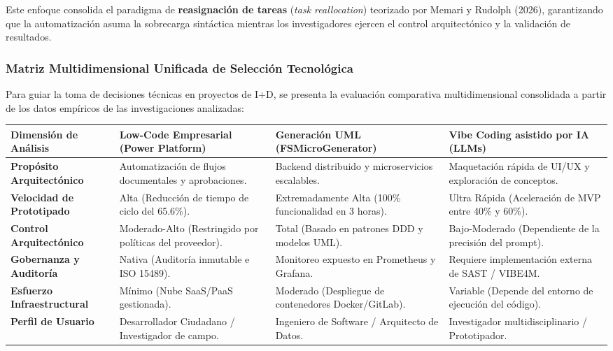 Este enfoque consolida el paradigma de \textbf{reasignación de tareas} (\textit{task reallocation}) teorizado por Memari y Rudolph (2026), garantizando que la automatización asuma la sobrecarga sintáctica mientras los investigadores ejercen el control arquitectónico y la validación de resultados.

\subsubsection{Matriz Multidimensional Unificada de Selección Tecnológica}

Para guiar la toma de decisiones técnicas en proyectos de I+D, se presenta la evaluación comparativa multidimensional consolidada a partir de los datos empíricos de las investigaciones analizadas:

\vspace{0.5cm}
\begin{center}
    \footnotesize
    \renewcommand{\arraystretch}{1.5}
    \begin{tabularx}{\textwidth}{>{\raggedright\arraybackslash\bfseries}p{2.8cm} >{\raggedright\arraybackslash}X >{\raggedright\arraybackslash}X >{\raggedright\arraybackslash}X}
    \toprule
    Dimensión de Análisis & \textbf{Low-Code Empresarial (Power Platform)} & \textbf{Generación UML (FSMicroGenerator)} & \textbf{Vibe Coding asistido por IA (LLMs)} \\
    \midrule
    Propósito Arquitectónico & Automatización de flujos documentales y aprobaciones. & Backend distribuido y microservicios escalables. & Maquetación rápida de UI/UX y exploración de conceptos. \\
    Velocidad de Prototipado & Alta (Reducción de tiempo de ciclo del 65.6\%). & Extremadamente Alta (100\% funcionalidad en 3 horas). & Ultra Rápida (Aceleración de MVP entre 40\% y 60\%). \\
    Control Arquitectónico & Moderado-Alto (Restringido por políticas del proveedor). & Total (Basado en patrones DDD y modelos UML). & Bajo-Moderado (Dependiente de la precisión del prompt). \\
    Gobernanza y Auditoría & Nativa (Auditoría inmutable e ISO 15489). & Monitoreo expuesto en Prometheus y Grafana. & Requiere implementación externa de SAST / VIBE4M. \\
    Esfuerzo Infraestructural & Mínimo (Nube SaaS/PaaS gestionada). & Moderado (Despliegue de contenedores Docker/GitLab). & Variable (Depende del entorno de ejecución del código). \\
    Perfil de Usuario & Desarrollador Ciudadano / Investigador de campo. & Ingeniero de Software / Arquitecto de Datos. & Investigador multidisciplinario / Prototipador. \\
    \bottomrule
    \end{tabularx}
\end{center}
\vspace{0.5cm}

